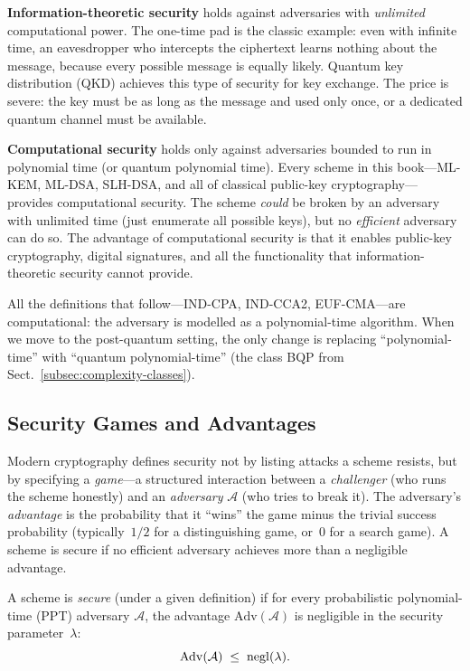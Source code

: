 \textbf{Information-theoretic security} holds against adversaries with \emph{unlimited} computational power.  The one-time pad is the classic example: even with infinite time, an eavesdropper who intercepts the ciphertext learns nothing about the message, because every possible message is equally likely.  Quantum key distribution (QKD) achieves this type of security for key exchange.  The price is severe: the key must be as long as the message and used only once, or a dedicated quantum channel must be available.

\textbf{Computational security} holds only against adversaries bounded to run in polynomial time (or quantum polynomial time).  Every scheme in this book---ML-KEM, ML-DSA, SLH-DSA, and all of classical public-key cryptography---provides computational security.  The scheme \emph{could} be broken by an adversary with unlimited time (just enumerate all possible keys), but no \emph{efficient} adversary can do so.  The advantage of computational security is that it enables public-key cryptography, digital signatures, and all the functionality that information-theoretic security cannot provide.

All the definitions that follow---IND-CPA, IND-CCA2, EUF-CMA---are computational: the adversary is modelled as a polynomial-time algorithm.  When we move to the post-quantum setting, the only change is replacing ``polynomial-time'' with ``quantum polynomial-time'' (the class BQP from Sect.~\ref{subsec:complexity-classes}).

\subsection{Security Games and Advantages}
\label{subsec:security-games}

Modern cryptography defines security not by listing attacks a scheme resists, but by specifying a \emph{game}---a structured interaction between a \emph{challenger} (who runs the scheme honestly) and an \emph{adversary} $\mathcal{A}$ (who tries to break it).  The adversary's \emph{advantage} is the probability that it ``wins'' the game minus the trivial success probability (typically~$1/2$ for a distinguishing game, or~$0$ for a search game).  A scheme is secure if no efficient adversary achieves more than a negligible advantage.

\begin{definition}
\label{def:asymptotic-security}
A scheme is \emph{secure} (under a given definition) if for every probabilistic polynomial-time (PPT) adversary $\mathcal{A}$, the advantage $\mathrm{Adv}(\mathcal{A})$ is negligible in the security parameter~$\lambda$:
\[
\mathrm{Adv}(\mathcal{A}) \;\leq\; \operatorname{negl}(\lambda).
\]
\end{definition}


